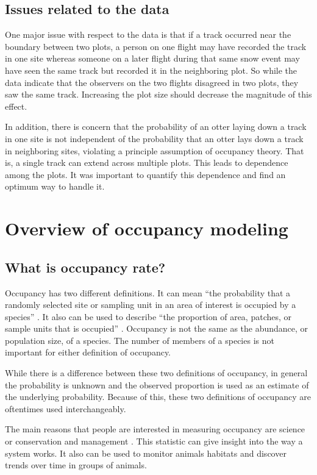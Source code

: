 \documentclass[12pt]{article}
\begin{document}
    \subsection{Issues related to the data}
    One major issue with respect to the data is that if a track occurred near
    the boundary between two plots, a person on one flight may have recorded the
    track in one site whereas someone on a later flight during that same snow
    event may have seen the same track but recorded it in the neighboring plot.
    So while the data indicate that the observers on the two flights disagreed
    in two plots, they saw the same track. Increasing the plot size should
    decrease the magnitude of this effect.

    In addition, there is concern that the probability of an otter laying down a
    track in one site is not independent of the probability that an otter lays
    down a track in neighboring sites, violating a principle assumption of
    occupancy theory. That is, a single track can extend across multiple plots.
    This leads to dependence among the plots. It was important to quantify this
    dependence and find an optimum way to handle it.

\section{Overview of occupancy modeling}

    \subsection{What is occupancy rate?}
    Occupancy has two different definitions. It can mean ``the probability that
    a randomly selected site or sampling unit in an area of interest is occupied
    by a species'' \cite{MacKenzie2006}. It also can be used to describe ``the
    proportion of area, patches, or sample units that is occupied''
    \cite{MacKenzie2006}. Occupancy is not the same as the abundance, or
    population size, of a species. The number of members of a species is not
    important for either definition of occupancy.

    While there is a difference between these two definitions of occupancy, in
    general the probability is unknown and the observed proportion is used as an
    estimate of the underlying probability. Because of this, these two
    definitions of occupancy are oftentimes used interchangeably.

    The main reasons that people are interested in measuring occupancy are
    science or conservation and management \cite{MacKenzie2006}. This statistic
    can give insight into the way a system works. It also can be used to monitor
    animals habitats and discover trends over time in groups of animals.
\end{document}
